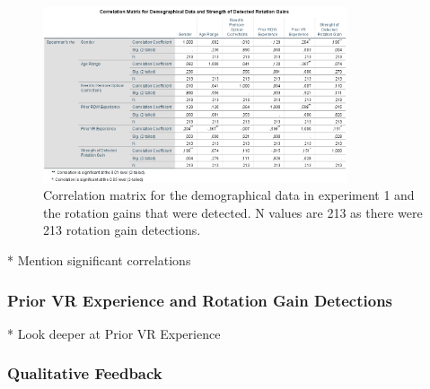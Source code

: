 \begin{figure}[tbph]
    \centering
    \includegraphics[width=0.8\textwidth]{figures/graphs/DemographicalCorrelations.png}
    \caption[Experiment 1 Demographical Correlation Matrix]{Correlation matrix for the demographical data in experiment 1 and the rotation gains that were detected. N values are 213 as there were 213 rotation gain detections.}
    \label{fig:ex1demogcorrelationmatrix}
\end{figure}

* Mention significant correlations

\subsubsection{Prior VR Experience and Rotation Gain Detections}
* Look deeper at Prior VR Experience


\subsubsection{Qualitative Feedback}

